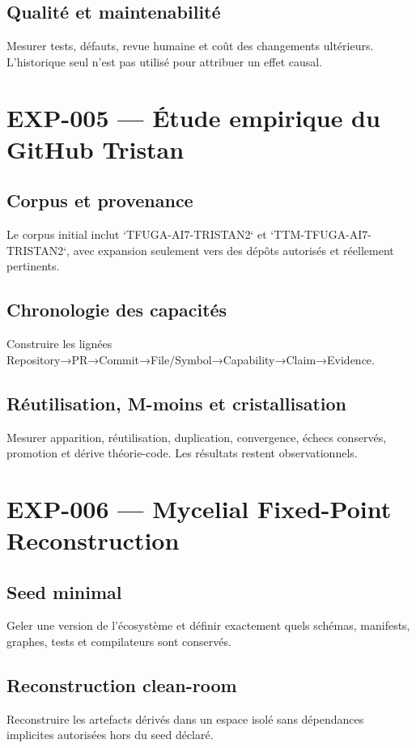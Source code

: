 \section{Qualité et maintenabilité}
Mesurer tests, défauts, revue humaine et coût des changements ultérieurs. L'historique seul n'est pas utilisé pour attribuer un effet causal.

\chapter{EXP-005 — Étude empirique du GitHub Tristan}
\section{Corpus et provenance}
Le corpus initial inclut `TFUGA-AI7-TRISTAN2` et `TTM-TFUGA-AI7-TRISTAN2`, avec expansion seulement vers des dépôts autorisés et réellement pertinents.

\section{Chronologie des capacités}
Construire les lignées Repository→PR→Commit→File/Symbol→Capability→Claim→Evidence.

\section{Réutilisation, M-moins et cristallisation}
Mesurer apparition, réutilisation, duplication, convergence, échecs conservés, promotion et dérive théorie-code. Les résultats restent observationnels.

\chapter{EXP-006 — Mycelial Fixed-Point Reconstruction}
\section{Seed minimal}
Geler une version de l'écosystème et définir exactement quels schémas, manifests, graphes, tests et compilateurs sont conservés.

\section{Reconstruction clean-room}
Reconstruire les artefacts dérivés dans un espace isolé sans dépendances implicites autorisées hors du seed déclaré.

